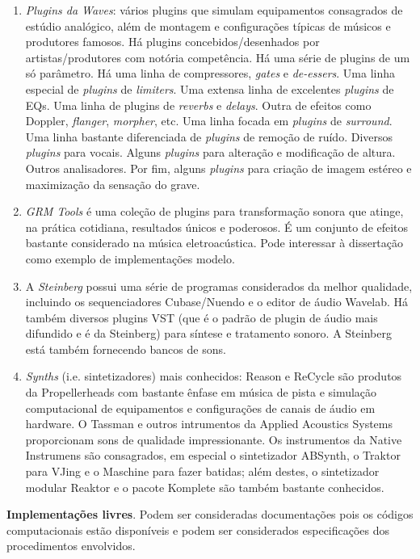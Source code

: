 \begin{enumerate}
    \item \emph{Plugins da Waves}: vários plugins que simulam equipamentos consagrados de estúdio analógico, além de montagem e configurações típicas de músicos e produtores famosos. Há plugins concebidos/desenhados por artistas/produtores com notória competência. Há uma série de plugins de um só parâmetro. Há uma linha de compressores, \emph{gates} e \emph{de-essers}. Uma linha especial de \emph{plugins} de \emph{limiters}. Uma extensa linha de excelentes \emph{plugins} de EQs. Uma linha de plugins de \emph{reverbs} e \emph{delays}. Outra de efeitos como Doppler, \emph{flanger}, \emph{morpher}, etc. Uma linha focada em \emph{plugins} de \emph{surround}. Uma linha bastante diferenciada de \emph{plugins} de remoção de ruído. Diversos \emph{plugins} para vocais. Alguns \emph{plugins} para alteração e modificação de altura. Outros analisadores. Por fim, alguns \emph{plugins} para criação de imagem estéreo e maximização da sensação do grave.
    \item \emph{GRM Tools} é uma coleção de plugins para transformação sonora que atinge, na prática cotidiana, resultados únicos e poderosos. É um conjunto de efeitos bastante considerado na música eletroacústica. Pode interessar à dissertação como exemplo de implementações modelo. 
    \item A \emph{Steinberg} possui uma série de programas considerados da melhor qualidade, incluindo os sequenciadores Cubase/Nuendo e o editor de áudio Wavelab. Há também diversos plugins VST (que é o padrão de plugin de áudio mais difundido e é da Steinberg) para síntese e tratamento sonoro. A Steinberg está também fornecendo bancos de sons. 
    \item \emph{Synths} (i.e. sintetizadores) mais conhecidos: Reason e ReCycle são produtos da Propellerheads com bastante ênfase em música de pista e simulação computacional de equipamentos e configurações de canais de áudio em hardware. O Tassman e outros intrumentos da Applied Acoustics Systems proporcionam sons de qualidade impressionante. Os instrumentos da Native Instrumens são consagrados, em especial o sintetizador ABSynth, o Traktor para VJing e o Maschine para fazer batidas; além destes, o sintetizador modular Reaktor e o pacote Komplete são também bastante conhecidos. 
\end{enumerate}

{\bf Implementações livres}. Podem ser consideradas documentações pois os códigos computacionais estão disponíveis e podem ser considerados especificações dos procedimentos envolvidos. 

